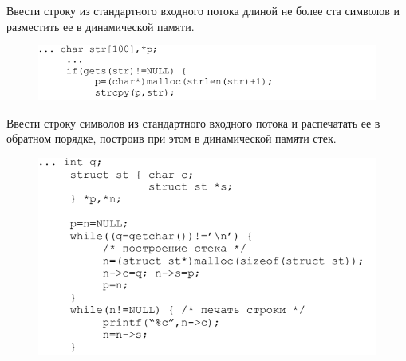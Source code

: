 \documentclass{beamer}
\begin{document}
\begin{frame}
Ввести строку из стандартного входного потока длиной не более ста символов и разместить ее в динамической памяти.
\begin{figure}[h]
\centering
\includegraphics[scale=0.6]{images/lec04-pic16.png}
\end{figure}
\end{frame}

\begin{frame}
Ввести строку символов из стандартного входного потока и распечатать ее в обратном порядке, построив при этом в динамической памяти стек.
\begin{figure}[h]
\centering
\includegraphics[scale=0.6]{images/lec04-pic17.png}
\end{figure}
\end{frame}
\end{document}
